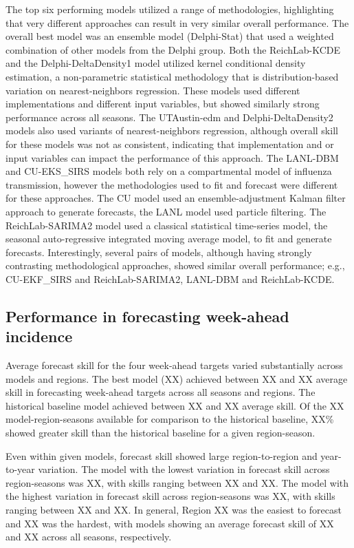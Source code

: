 \documentclass{article}\usepackage[]{graphicx}\usepackage[]{color}
\begin{document}
The top six performing models utilized a range of methodologies, highlighting that very different approaches can result in very similar overall performance. 
The overall best model was an ensemble model (Delphi-Stat) that used a weighted combination of other models from the Delphi group.
Both the ReichLab-KCDE and the Delphi-DeltaDensity1 model utilized kernel conditional density estimation, a non-parametric statistical methodology that is distribution-based variation on nearest-neighbors regression. 
These models used different implementations and different input variables, but showed similarly strong performance across all seasons.
The UTAustin-edm and Delphi-DeltaDensity2 models also used variants of nearest-neighbors regression, although overall skill for these models was not as consistent, indicating that implementation and or input variables can impact the performance of this approach.
The LANL-DBM and CU-EKS\_SIRS models both rely on a compartmental model of influenza transmission, however the methodologies used to fit and forecast were different for these approaches.
The CU model used an ensemble-adjustment Kalman filter approach to generate forecasts, the LANL model used particle filtering.
The ReichLab-SARIMA2 model used a classical statistical time-series model, the seasonal auto-regressive integrated moving average model, to fit and generate forecasts. 
Interestingly, several pairs of models, although having strongly contrasting methodological approaches, showed similar overall performance; e.g., CU-EKF\_SIRS and ReichLab-SARIMA2, LANL-DBM and ReichLab-KCDE.

\subsection{Performance in forecasting week-ahead incidence}

Average forecast skill for the four week-ahead targets varied substantially across models and regions.
The best model (XX) achieved between XX and XX average skill in forecasting week-ahead targets across all seasons and regions.
The historical baseline model achieved between XX and XX average skill.
Of the XX model-region-seasons available for comparison to the historical baseline, XX\% showed greater skill than the historical baseline for a given region-season.


Even within given models, forecast skill showed large region-to-region and year-to-year variation. 
The model with the lowest variation in forecast skill across region-seasons was XX, with skills ranging between XX and XX.
The model with the highest variation in forecast skill across region-seasons was XX, with skills ranging between XX and XX.
In general, Region XX was the easiest to forecast and XX was the hardest, with models showing an average forecast skill of XX and XX across all seasons, respectively.
\end{document}
